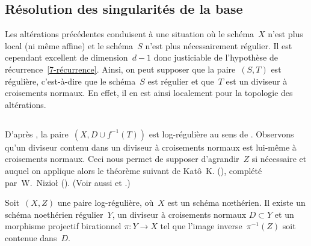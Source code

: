 \documentclass[10pt]{smfart}
\begin{document}
\subsection{Résolution des singularités de la base}
Les altérations précédentes conduisent à une situation
où le schéma $X$ n'est plus local (ni même affine) et
le schéma $S$ n'est plus nécessairement régulier.
Il est cependant excellent de dimension $d-1$
donc justiciable de l'hypothèse de récurrence \ref{7-récurrence}.
Ainsi, on peut supposer que la paire $(S,T)$ est régulière,
c'est-à-dire que le schéma $S$ est régulier et que $T$
est un diviseur à croisements normaux. En effet,
il en est ainsi localement pour la topologie des altérations.

\subsection{}
D'après ,
la paire $(X,D ∪ f^{-1}(T))$ est log-régulière
au sens de .
Observons qu'un diviseur contenu dans un
diviseur à croisements normaux est lui-même à croisements normaux.
Ceci nous permet de supposer d'agrandir $Z$ si
nécessaire et auquel on applique alors le théorème suivant
de Katô K. (\cite[10.3, 10.4]{Toric@Kato}), complété par W. Nizioł
(\cite[5.7]{Toric@Niziol}). (Voir aussi \cite[§5.6]{HT@GR} et .)

\begin{théorème}
Soit $(X,Z)$ une paire log-régulière, où $X$ est un schéma nœthérien.
Il existe un schéma noethérien régulier $Y$, un diviseur à
croisements normaux $D⊂Y$ et un morphisme projectif birationnel $π:Y→ X$
tel que l'image inverse $π^{−1}(Z)$ soit contenue dans $D$.
\end{théorème}

\ifx\danslelivre\undefined


\end{document}

